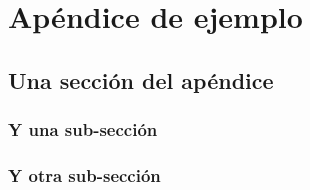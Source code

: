 \chapter{Apéndice de ejemplo}

\lipsum[3]

\section{Una sección del apéndice}

\lipsum[4]

\subsection{Y una sub-sección}

\lipsum[5-8]

\subsection{Y otra sub-sección}

\lipsum[5-8]